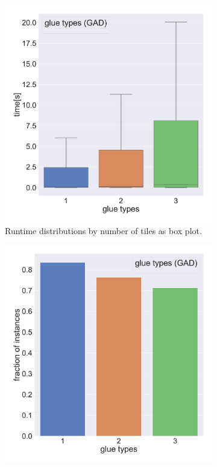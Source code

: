 \begin{figure}[htpb]
\centering
\begin{subfigure}[b]{0.48\textwidth}
\centering
\includegraphics[width=\textwidth]{figures/plots/heuristic_solvers_i1/gad_i1_time_over_glue_types.pdf}
\caption{Runtime distributions by number of tiles as box plot.}
\label{fig:gad_i1_time_over_glue_types}
\end{subfigure}
\hfill
\begin{subfigure}[b]{0.48\textwidth}
\centering
\includegraphics[width=\textwidth]{figures/plots/heuristic_solvers_i1/gad_i1_fraction_solved_over_glue_types.pdf}

\end{subfigure}
\end{figure}
